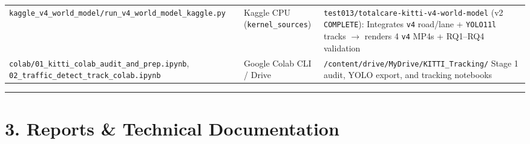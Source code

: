 \documentclass[10.5pt,a4paper]{article}
\begin{document}
\begin{footnotesize}
\begin{longtable}{>{\raggedright\arraybackslash}p{} >{\raggedright\arraybackslash}p{} >{\raggedright\arraybackslash}p{}}
\texttt{kaggle\_\allowbreak{}v4\_\allowbreak{}world\_\allowbreak{}model/\allowbreak{}run\_\allowbreak{}v4\_\allowbreak{}world\_\allowbreak{}model\_\allowbreak{}kaggle.\allowbreak{}py} & Kaggle CPU (\texttt{kernel\_\allowbreak{}sources}) & \texttt{test013/\allowbreak{}totalcare-\allowbreak{}kitti-\allowbreak{}v4-\allowbreak{}world-\allowbreak{}model} (v2 \texttt{COMPLETE}): Integrates \texttt{v4} road/lane + \texttt{YOLO11l} tracks $\rightarrow$ renders 4 \texttt{v4} MP4s + RQ1--RQ4 validation \\
\texttt{colab/\allowbreak{}01\_\allowbreak{}kitti\_\allowbreak{}colab\_\allowbreak{}audit\_\allowbreak{}and\_\allowbreak{}prep.\allowbreak{}ipynb}, \texttt{02\_\allowbreak{}traffic\_\allowbreak{}detect\_\allowbreak{}track\_\allowbreak{}colab.\allowbreak{}ipynb} & Google Colab CLI / Drive & \texttt{/\allowbreak{}content/\allowbreak{}drive/\allowbreak{}MyDrive/\allowbreak{}KITTI\_\allowbreak{}Tracking/\allowbreak{}} Stage 1 audit, YOLO export, and tracking notebooks \\
\end{longtable}
\end{footnotesize}


\par\noindent\rule{\textwidth}{0.4pt}\par\medskip

\section{3. Reports \& Technical Documentation}
\end{document}
